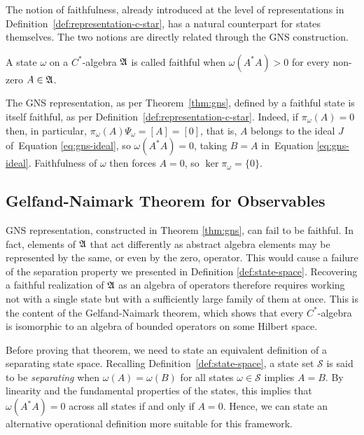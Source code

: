 The notion of faithfulness, already introduced at the level of representations in Definition~\ref{def:representation-c-star}, has a natural counterpart for states themselves. The two notions are directly related through the GNS construction.

\begin{definition}
	\label{def:faithful-state}
	A state $\omega$ on a $C^*$-algebra $\mathfrak{A}$ is called faithful when $\omega(A^*A) > 0$ for every non-zero $A \in \mathfrak{A}$.
\end{definition}

\begin{remark}
	The GNS representation, as per Theorem~\ref{thm:gns}, defined by a faithful state is itself faithful, as per Definition~\ref{def:representation-c-star}. Indeed, if $\pi_\omega(A)=0$ then, in particular, $\pi_\omega(A)\Psi_\omega = [A] = [0]$, that is, $A$ belongs to the ideal $J$ of~Equation \eqref{eq:gns-ideal}, so $\omega(A^*A)=0$, taking $B=A$ in~Equation \eqref{eq:gns-ideal}. Faithfulness of $\omega$ then forces $A=0$, so $\ker\pi_\omega = \{0\}$.
\end{remark}


\subsection*{Gelfand-Naimark Theorem for Observables}
\label{sec:gelfand-naimark}

 GNS representation, constructed in Theorem \ref{thm:gns}, can fail to be faithful. In fact, elements of $\mathfrak{A}$ that act differently as abstract algebra elements may be represented by the same, or even by the zero, operator. This would cause a failure of the separation property we presented in Definition \ref{def:state-space}. Recovering a faithful realization of $\mathfrak{A}$ as an algebra of operators therefore requires working not with a single state but with a sufficiently large family of them at once. This is the content of the Gelfand-Naimark theorem, which shows that every $C^*$-algebra is isomorphic to an algebra of bounded operators on some Hilbert space. 

Before proving that theorem, we need to state an equivalent definition of a separating state space. Recalling Definition~\ref{def:state-space}, a state set $\mathcal{S}$ is said to be \emph{separating} when $\omega(A) = \omega(B)$ for all states $\omega \in \mathcal{S}$ implies $A = B$. By linearity and the fundamental properties of the states, this implies that $\omega(A^*A) = 0$ across all states if and only if $A = 0$. Hence, we can state an alternative operational definition more suitable for this framework.

